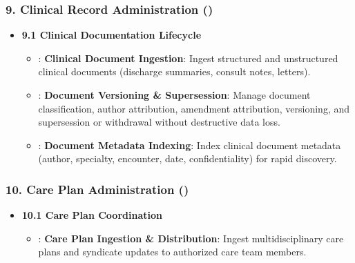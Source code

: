 \subsubsection*{9. Clinical Record Administration (\texttt{})}
\label{rad:enabling:328}

\begin{itemize}

\item
\textbf{9.1 Clinical Documentation Lifecycle}


\begin{itemize}

\item
\texttt{}: \textbf{Clinical Document Ingestion}: Ingest structured and unstructured clinical documents (discharge summaries, consult notes, letters).



\item
\texttt{}: \textbf{Document Versioning \& Supersession}: Manage document classification, author attribution, amendment attribution, versioning, and supersession or withdrawal without destructive data loss.



\item
\texttt{}: \textbf{Document Metadata Indexing}: Index clinical document metadata (author, specialty, encounter, date, confidentiality) for rapid discovery.



\end{itemize}


\end{itemize}
\label{rad:enabling:333}
\subsubsection*{10. Care Plan Administration (\texttt{})}
\label{rad:enabling:334}

\begin{itemize}

\item
\textbf{10.1 Care Plan Coordination}


\begin{itemize}

\item
\texttt{}: \textbf{Care Plan Ingestion \& Distribution}: Ingest multidisciplinary care plans and syndicate updates to authorized care team members.



\end{itemize}


\end{itemize}
\label{rad:enabling:337}

